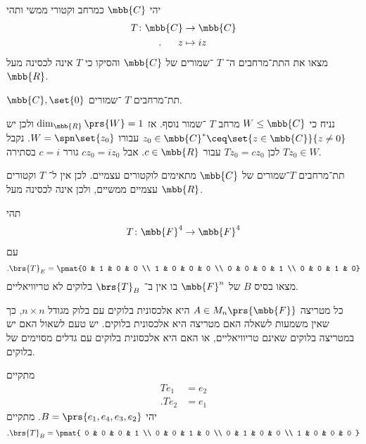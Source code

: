 \documentclass[a4paper,10pt,oneside,openany]{article}
\begin{document}
\begin{exercise}
יהי
$\mbb{C}$
כמרחב וקטורי ממשי ותהי
\begin{align*}
T \colon \mbb{C} &\to \mbb{C} \\
\text{.} \hphantom{lala} z &\mapsto iz
\end{align*}
מצאו את התת־מרחבים ה־%
$T$%
־שמורים של
$\mbb{C}$
והסיקו כי
$T$
אינה לכסינה מעל
$\mbb{R}$.
\end{exercise}

\begin{solution}
$\mbb{C}, \set{0}$
תת־מרחבים
$T$%
־שמורים.

נניח כי
$W \leq \mbb{C}$
מרחב
$T$%
־שמור נוסף. אז
$\dim_{\mbb{R}}\prs{W} = 1$
ולכן יש
$z_0 \in \mbb{C}^* \ceq \set{z \in \mbb{C}}{z \neq 0}$
עבורו
$W = \spn\set{z_0}$.
נקבל
$Tz_0 \in W$
לכן
$Tz_0 = c z_0$
עבור
$c \in \mbb{R}$.
אבל
$c z_0 = i z_0$
גורר
$c = i$
בסתירה.

תת־מרחבים $T$־שמורים של
$\mbb{C}$
מתאימים לוקטורים עצמיים. לכן אין ל־%
$T$
וקטורים עצמיים ממשיים, ולכן אינה לכסינה מעל
$\mbb{R}$.
\end{solution}

\begin{exercise}
תהי
\begin{align*}
T \colon \mbb{F}^4 \to \mbb{F}^4
\end{align*}
עם
\[\text{.} \brs{T}_E = \pmat{0 & 1 & 0 & 0 \\ 1 & 0 & 0 & 0 \\ 0 & 0 & 0 & 1 \\ 0 & 0 & 1 & 0}\]
מצאו בסיס
$B$
של
$\mbb{F}^n$
בו אין ב־%
$\brs{T}_B$
בלוקים לא טריוויאליים.
\end{exercise}

\begin{remark}
כל מטריצה
$A \in M_n\prs{\mbb{F}}$
היא אלכסונית בלוקים עם בלוק מגודל
$n \times n$,
כך שאין משמעות לשאלה האם מטריצה היא אלכסונית בלוקים. יש טעם לשאול האם יש במטריצה בלוקים שאינם טריוויאליים, או האם היא אלכסונית בלוקים עם גדלים מסוימים של בלוקים.
\end{remark}

\begin{solution}
מתקיים
\begin{align*}
T e_1 &= e_2 \\
\text{.} T e_2 &= e_1
\end{align*}
יהי
$B = \prs{e_1, e_4, e_3, e_2}$.
מתקיים
\begin{align*}
\text{.} \brs{T}_B = \pmat{
0 & 0 & 0 & 1 \\
0 & 0 & 1 & 0 \\
0 & 1 & 0 & 0 \\
1 & 0 & 0 & 0
}
\end{align*}
\end{solution}
\end{document}
